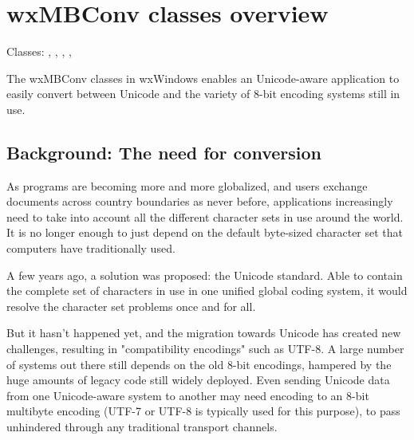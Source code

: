 
\section{wxMBConv classes overview}\label{mbconvclasses}

Classes: , , 
, , 

The wxMBConv classes in wxWindows enables an Unicode-aware application to
easily convert between Unicode and the variety of 8-bit encoding systems still
in use.

\subsection{Background: The need for conversion}

As programs are becoming more and more globalized, and users exchange documents
across country boundaries as never before, applications increasingly need to
take into account all the different character sets in use around the world. It
is no longer enough to just depend on the default byte-sized character set that
computers have traditionally used.

A few years ago, a solution was proposed: the Unicode standard. Able to contain
the complete set of characters in use in one unified global coding system,
it would resolve the character set problems once and for all.

But it hasn't happened yet, and the migration towards Unicode has created new
challenges, resulting in "compatibility encodings" such as UTF-8. A large
number of systems out there still depends on the old 8-bit encodings, hampered
by the huge amounts of legacy code still widely deployed. Even sending
Unicode data from one Unicode-aware system to another may need encoding to an
8-bit multibyte encoding (UTF-7 or UTF-8 is typically used for this purpose), to
pass unhindered through any traditional transport channels.

